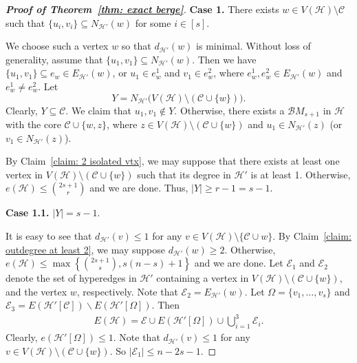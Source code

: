 \documentclass[11pt]{article}
\numberwithin{equation}{section}
\newcounter{cases}
\newcommand\cB{{\mathcal B}}
\newcommand\cC{{\mathcal C}}
\newcommand\cE{{\mathcal E}}
\newcommand\cH{{\mathcal H}}
\begin{document}
\begin{proof}[\bf Proof of Theorem~\ref{thm: exact berge}]

    \smallskip
    \noindent\textbf{Case 1.}  There exists $w \in V(\cH)\setminus \cC$ such that $\{u_i,v_i\} \subseteq N_{\cH'}(w)$ for some $i\in [s]$.
    \smallskip
    \smallskip

    We choose such a vertex $w$ so that $d_{\cH'}(w)$ is minimal.
    Without loss of generality, assume that $\{u_1,v_1\} \subseteq N_{\cH'}(w)$. Then we have $\{u_1,v_1\} \subseteq e_w\in E_{\cH'}(w)$, or $u_1\in e_{w}^1$ and $v_1\in e_{w}^2$, where $e_{w}^1,e_{w}^2\in E_{\cH'}(w)$ and $e_{w}^1\neq e_{w}^2$.
        Let
        \[
        Y = N_{\cH'}\big(V(\cH)\setminus \left(\cC \cup\{w\}\right)\big).
        \]
    Clearly, $Y \subseteq \cC$. We claim that $u_1,v_1\notin Y$. Otherwise, there exists a $\cB M_{s+1}$ in $\cH$ with the core $\cC\cup\{w,z\}$, where $z\in V(\cH)\setminus \left(\cC \cup\{w\}\right)$ and $u_1\in N_{\cH'}(z)$ (or $v_1\in N_{\cH'}(z)$).

    By Claim~\ref{claim: 2 isolated vtx}, we may suppose that there exists at least one vertex in $V(\cH)\setminus \left(\cC \cup\{w\}\right)$ such that its degree in $\cH'$ is at least 1. Otherwise, $e(\cH)\leq \binom{2s+1}{r}$ and we are done.
    Thus, $|Y|\ge r-1=s-1$. %

    \smallskip
    \noindent\textbf{Case 1.1.} $|Y| = s-1$.
    \smallskip
    \smallskip

    It is easy to see that $d_{\cH'}(v)\le 1$ for any $v\in V(\cH)\setminus \{\cC\cup w\}$. By Claim~\ref{claim: outdegree at least 2}, we may suppose $d_{\cH'}(w) \ge 2$. Otherwise, $e(\cH)\leq \max\left\{\binom{2s+1}{s},s(n-s)+1\right\}$ and we are done.
    Let $\cE_{1}$ and $\cE_{2}$ denote the set of hyperedges in $\cH'$ containing a vertex in $V(\cH)\setminus (\cC \cup \{w\})$, and the vertex $w$, respectively. Note that $\cE_{2}=E_{\cH'}(w)$. Let $\Omega = \{v_1,\ldots,v_s\}$ and $\cE_{3}=E(\cH'[\cC])\backslash E(\cH'[\Omega])$. Then
  \begin{align*}
  E(\cH)= \cE\cup E(\cH'[\Omega])\cup \bigcup_{i=1}^{3}\cE_{i}.
  \end{align*}
Clearly, $e(\cH'[\Omega])\le 1$. Note that $d_{\cH'}(v) \le 1$ for any $v \in V(\cH) \setminus (\cC \cup \{w\})$.
So $|\cE_{1}|\le n-2s-1$.




\end{proof}
\end{document}
